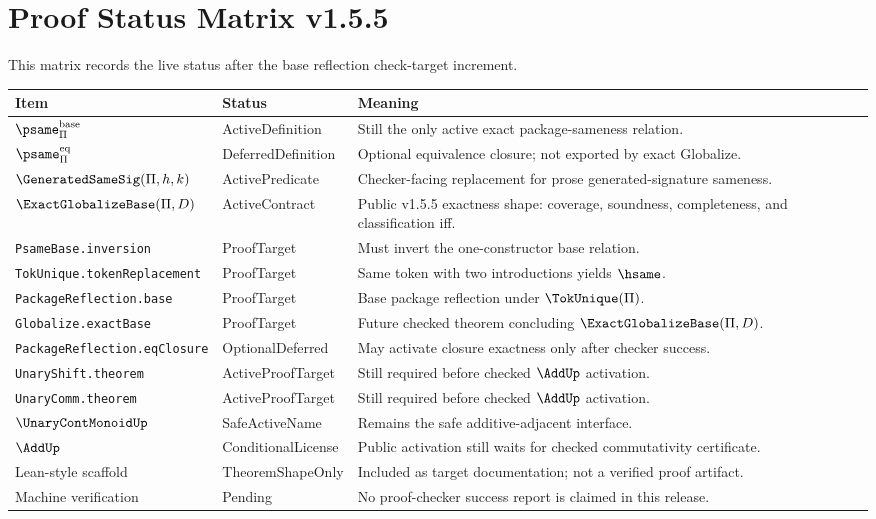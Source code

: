 \chapter{Proof Status Matrix v1.5.5}
\label{ch:v155-status-matrix}

This matrix records the live status after the base reflection check-target increment.

\begin{longtable}{p{}p{}p{}}
\toprule
\textbf{Item} & \textbf{Status} & \textbf{Meaning}\\
\midrule
\(\psame_{\Pi}^{\mathrm{base}}\) & ActiveDefinition & Still the only active exact package-sameness relation.\\
\(\psame_{\Pi}^{\mathrm{eq}}\) & DeferredDefinition & Optional equivalence closure; not exported by exact Globalize.\\
\(\GeneratedSameSig(\Pi,h,k)\) & ActivePredicate & Checker-facing replacement for prose generated-signature sameness.\\
\(\ExactGlobalizeBase(\Pi,D)\) & ActiveContract & Public v1.5.5 exactness shape: coverage, soundness, completeness, and classification iff.\\
\texttt{PsameBase.inversion} & ProofTarget & Must invert the one-constructor base relation.\\
\texttt{TokUnique.tokenReplacement} & ProofTarget & Same token with two introductions yields \(\hsame\).\\
\texttt{PackageReflection.base} & ProofTarget & Base package reflection under \(\TokUnique(\Pi)\).\\
\texttt{Globalize.exactBase} & ProofTarget & Future checked theorem concluding \(\ExactGlobalizeBase(\Pi,D)\).\\
\texttt{PackageReflection.eqClosure} & OptionalDeferred & May activate closure exactness only after checker success.\\
\texttt{UnaryShift.theorem} & ActiveProofTarget & Still required before checked \(\AddUp\) activation.\\
\texttt{UnaryComm.theorem} & ActiveProofTarget & Still required before checked \(\AddUp\) activation.\\
\(\UnaryContMonoidUp\) & SafeActiveName & Remains the safe additive-adjacent interface.\\
\(\AddUp\) & ConditionalLicense & Public activation still waits for checked commutativity certificate.\\
Lean-style scaffold & TheoremShapeOnly & Included as target documentation; not a verified proof artifact.\\
Machine verification & Pending & No proof-checker success report is claimed in this release.\\
\bottomrule
\end{longtable}

